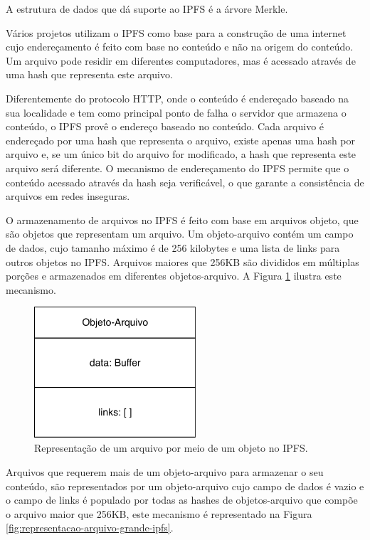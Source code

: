 \documentclass[tcc,capa]{texufpel}
\begin{document}
    A estrutura de dados que dá suporte ao IPFS é a árvore Merkle.
    
    Vários projetos utilizam o IPFS como base para a construção de uma internet cujo endereçamento é feito com base no conteúdo e não na origem do conteúdo. Um arquivo pode residir em diferentes computadores, mas é acessado através de uma hash que representa este arquivo.
    
    Diferentemente do protocolo HTTP, onde o conteúdo é endereçado baseado na sua localidade e tem como principal ponto de falha o servidor que armazena o conteúdo, o IPFS provê o endereço baseado no conteúdo. Cada arquivo é endereçado por uma hash que representa o arquivo, existe apenas uma hash por arquivo e, se um único bit do arquivo for modificado, a hash que representa este arquivo será diferente. O mecanismo de endereçamento do IPFS permite que o conteúdo acessado através da hash seja verificável, o que garante a consistência de arquivos em redes inseguras.
    
    O armazenamento de arquivos no IPFS é feito com base em arquivos objeto, que são objetos que representam um arquivo. Um objeto-arquivo contém um campo de dados, cujo tamanho máximo é de 256 kilobytes e uma lista de links para outros objetos no IPFS. Arquivos maiores que 256KB são divididos em múltiplas porções e armazenados em diferentes objetos-arquivo. A Figura \ref{fig:arquivo-objeto-ipfs} ilustra este mecanismo.
    
    \begin{figure}[h!]
        \centering
        \includegraphics[width=6cm]{imagens/arquivo-objeto-ipfs.pdf}
        \caption{Representação de um arquivo por meio de um objeto no IPFS.}
        \label{fig:arquivo-objeto-ipfs}
    \end{figure}
    
    Arquivos que requerem mais de um objeto-arquivo para armazenar o seu conteúdo, são representados por um objeto-arquivo cujo campo de dados é vazio e o campo de links é populado por todas as hashes de objetos-arquivo que compõe o arquivo maior que 256KB, este mecanismo é representado na Figura \ref{fig:representacao-arquivo-grande-ipfs}.
    
\end{document}
